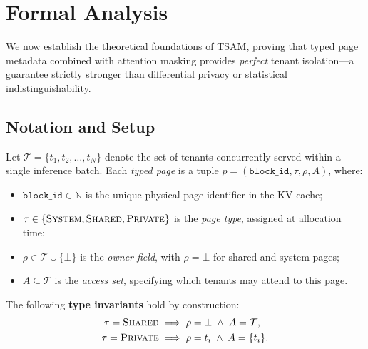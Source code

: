 
\section{Formal Analysis}
\label{sec:formal}

We now establish the theoretical foundations of TSAM, proving that typed page metadata
combined with attention masking provides \emph{perfect} tenant isolation---a guarantee
strictly stronger than differential privacy or statistical indistinguishability.

\subsection{Notation and Setup}
\label{sec:formal:notation}

Let $\mathcal{T} = \{t_1, t_2, \ldots, t_N\}$ denote the set of tenants concurrently
served within a single inference batch. Each \emph{typed page} is a tuple
$p = (\texttt{block\_id}, \tau, \rho, A)$, where:
\begin{itemize}[leftmargin=1.5em,itemsep=2pt]
    \item $\texttt{block\_id} \in \mathbb{N}$ is the unique physical page identifier in
          the KV cache;
    \item $\tau \in \{\textsc{System}, \textsc{Shared}, \textsc{Private}\}$ is the
          \emph{page type}, assigned at allocation time;
    \item $\rho \in \mathcal{T} \cup \{\bot\}$ is the \emph{owner field}, with
          $\rho = \bot$ for shared and system pages;
    \item $A \subseteq \mathcal{T}$ is the \emph{access set}, specifying which tenants
          may attend to this page.
\end{itemize}

\noindent
The following \textbf{type invariants} hold by construction:
\begin{align}
    \tau = \textsc{Shared}  &\implies \rho = \bot \;\wedge\; A = \mathcal{T}, \label{eq:inv-shared}\\
    \tau = \textsc{Private} &\implies \rho = t_i \;\wedge\; A = \{t_i\}. \label{eq:inv-private}
\end{align}

